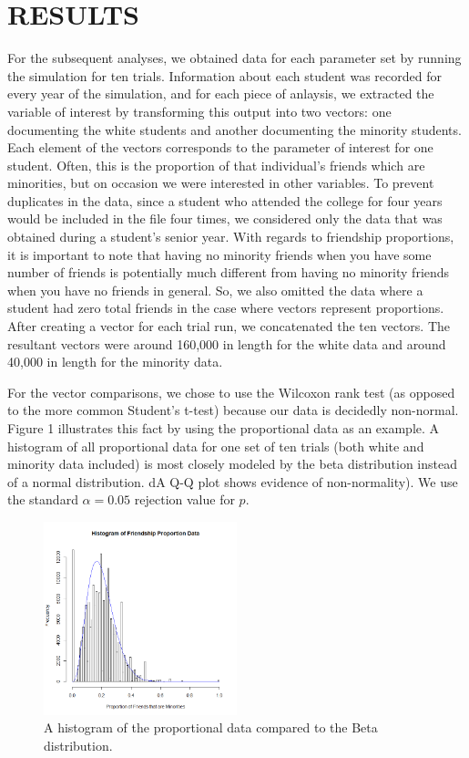 
\section{RESULTS}
\label{sec:results}

For the subsequent analyses, we obtained data for each parameter set by running the simulation for ten trials. Information about each student was recorded for every year of the 
simulation, and for each piece of anlaysis, we extracted the variable of interest by transforming this output into two vectors: one documenting the white students and another documenting the minority students. Each element of the vectors corresponds to the parameter of interest for one student. Often, this is the proportion of that individual's friends which are 
minorities, but on occasion we were interested in other variables. To prevent duplicates in the data, since a student who attended the college for four years would be included in the file four 
times, we considered only the data that was obtained during a student's senior year. With regards to friendship proportions, it is important to note 
that having no minority friends when you have some number of friends is potentially much different from having no 
minority friends when you have no friends in general. So, we also omitted the data where a student had zero total friends in the case where vectors represent proportions.
After creating a vector for each trial run, we concatenated the ten vectors. The resultant vectors were around 160,000 in 
length for the white data and around 40,000 in length for the minority data.

For the vector comparisons, we chose to use the Wilcoxon rank test (as opposed
to the more common Student's t-test) because our data is decidedly non-normal.
Figure 1 illustrates this fact by using the proportional data as an example. A
histogram of all proportional data for one set of ten trials (both white and
minority data included) is most closely modeled by the beta distribution
instead of a normal distribution. dA Q-Q plot shows evidence of
non-normality). We use the standard $\alpha=0.05$ rejection value for $p$.

\begin{figure}[ht]
  \centering
    \includegraphics[width=0.5\textwidth]{histogramProportionData.png}
      \caption{A histogram of the proportional data compared to the Beta distribution.}
\end{figure}

